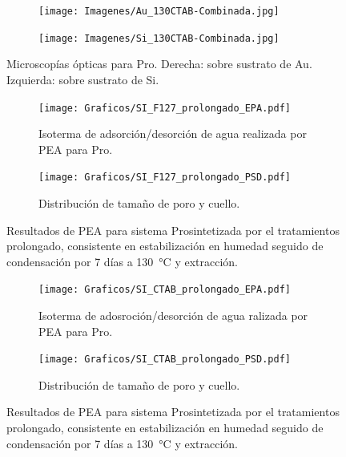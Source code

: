		 \begin{figure}
	 	   	    \begin{subfigure}{0.495\textwidth}
		       	\texttt{[image: Imagenes/Au\_130CTAB-Combinada.jpg]}
		   		\end{subfigure}
		   		\begin{subfigure}{0.495\textwidth}
		   	    \texttt{[image: Imagenes/Si\_130CTAB-Combinada.jpg]}
		   		\end{subfigure}
				 \caption[Microscopía óptica \pdmC\space tratamiento prolongado.]{Microscopías ópticas para Pro\pdmC. Derecha: sobre sustrato de Au. Izquierda: sobre sustrato de Si.}
				 \label{fig:Microscopia_CTAB_prolongado}	
			     \end{figure}
			    

			 \begin{figure}
			  	\begin{subfigure}{0.495\textwidth}
			  	\texttt{[image: Graficos/SI\_F127\_prolongado\_EPA.pdf]}
				\caption{Isoterma de adsorción/desorción de agua realizada por PEA para Pro\pdmF.}
				\label{fig:F127_prolongado_EPA}
				\end{subfigure}
				\begin{subfigure}{0.495\textwidth}
			  	\texttt{[image: Graficos/SI\_F127\_prolongado\_PSD.pdf]}
				\caption{Distribución de tamaño de poro y cuello.\\ }
				\label{fig:F127_prolongado_PSD}
				\end{subfigure}
				\caption[Elipsoporosimetría \pdmF\space tratamiento prolongado.]{Resultados de PEA para sistema Pro\pdmF\space sintetizada por el tratamientos prolongado, consistente en estabilización en humedad seguido de condensación por 7 días a \SI{130}{\celsius} y extracción.}
		 		\end{figure}

		 \begin{figure}
		  	\begin{subfigure}{0.495\textwidth}
		  	\texttt{[image: Graficos/SI\_CTAB\_prolongado\_EPA.pdf]}
			\caption{Isoterma de adosroción/desorción de agua ralizada por PEA para Pro\pdmC\space.}
			\label{fig:CTAB_prolongado_EPA}
			\end{subfigure}
			\begin{subfigure}{0.495\textwidth}
		  	\texttt{[image: Graficos/SI\_CTAB\_prolongado\_PSD.pdf]}
			\caption{Distribución de tamaño de poro y cuello.\\ }
			\label{fig:CTAB_prolongado_PSD}
			\end{subfigure}
			\caption[Elipsoporosimetría \pdmC\space tratamiento prolongado.]{Resultados de PEA para sistema Pro\pdmC\space sintetizada por el tratamientos prolongado, consistente en estabilización en humedad seguido de condensación por 7 días a \SI{130}{\celsius} y extracción.}
			\end{figure}

